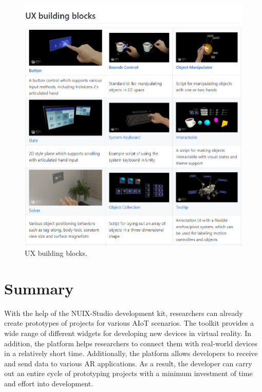 \begin{figure}
  \centering
  \includegraphics[width=0.6\linewidth]{figures/MRTK.png}
  \caption{UX building blocks.}
  \label{fig:MRTK-figure}
\end{figure}

\section{Summary}

With the help of the NUIX-Studio development kit, researchers can already create prototypes of projects for various AIoT scenarios. The toolkit provides a wide range of different widgets for developing new devices in virtual reality. In addition, the platform helps researchers to connect them with real-world devices in a relatively short time. Additionally, the platform allows developers to receive and send data to various AR applications. As a result, the developer can carry out an entire cycle of prototyping projects with a minimum investment of time and effort into development.